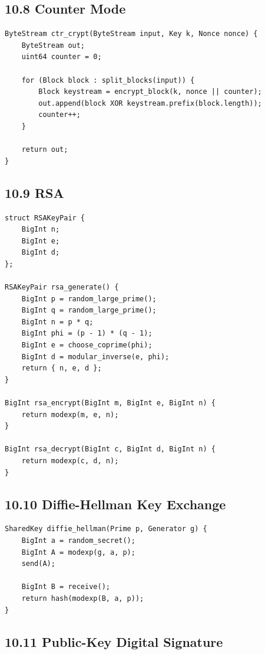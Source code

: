 \documentclass[11pt]{article}
\begin{document}
\subsection{10.8 Counter Mode}\label{counter-mode}

\begin{verbatim}
ByteStream ctr_crypt(ByteStream input, Key k, Nonce nonce) {
    ByteStream out;
    uint64 counter = 0;

    for (Block block : split_blocks(input)) {
        Block keystream = encrypt_block(k, nonce || counter);
        out.append(block XOR keystream.prefix(block.length));
        counter++;
    }

    return out;
}
\end{verbatim}

\subsection{10.9 RSA}\label{rsa}

\begin{verbatim}
struct RSAKeyPair {
    BigInt n;
    BigInt e;
    BigInt d;
};

RSAKeyPair rsa_generate() {
    BigInt p = random_large_prime();
    BigInt q = random_large_prime();
    BigInt n = p * q;
    BigInt phi = (p - 1) * (q - 1);
    BigInt e = choose_coprime(phi);
    BigInt d = modular_inverse(e, phi);
    return { n, e, d };
}

BigInt rsa_encrypt(BigInt m, BigInt e, BigInt n) {
    return modexp(m, e, n);
}

BigInt rsa_decrypt(BigInt c, BigInt d, BigInt n) {
    return modexp(c, d, n);
}
\end{verbatim}

\subsection{10.10 Diffie-Hellman Key
Exchange}\label{diffie-hellman-key-exchange}

\begin{verbatim}
SharedKey diffie_hellman(Prime p, Generator g) {
    BigInt a = random_secret();
    BigInt A = modexp(g, a, p);
    send(A);

    BigInt B = receive();
    return hash(modexp(B, a, p));
}
\end{verbatim}

\subsection{10.11 Public-Key Digital
Signature}\label{public-key-digital-signature}
\end{document}
